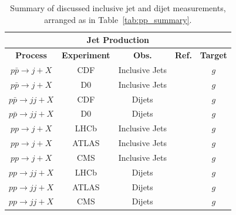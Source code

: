 \documentclass[12pt,oneside,openright]{report}
\begin{document}
\begin{spacing}{1.5}
\begin{table}
\begin{center}
\begin{tabular}{|c|c|c|c|c|}
\hline
\multicolumn{5}{|c|}{\textbf{Jet Production}}\\
\hline
\textbf{Process} & \textbf{Experiment} & \textbf{Obs.} &\textbf{Ref.} &  \textbf{Target} \\
\hline\hline
$p\bar{p} \to j + X $ & CDF & Inclusive Jets & \cite{Abulencia:2007ez,Aaltonen:2008eq} & $g$\\
$p\bar{p} \to j + X $ & D0 & Inclusive Jets & \cite{Abazov:2008ae} & $g$\\
\hline
$p\bar{p} \to jj + X $ & CDF & Dijets & \cite{Aaltonen:2008dn} & $g$\\
$p\bar{p} \to jj + X $ & D0 & Dijets & \cite{Abazov:2010fr} & $g$ \\
\hline
\hline
$pp \to j + X $ & LHCb & Inclusive Jets &\cite{LHCb:2011xqa} & $g$\\
$pp \to j + X $ & ATLAS & Inclusive Jets &\cite{Aad:2010ad,Aad:2011fc,Aad:2013lpa} & $g$ \\
$pp \to j + X $ & CMS & Inclusive Jets &\cite{CMS:2011ab,Chatrchyan:2012gwa,Chatrchyan:2012bja} & $g$ \\
\hline
$pp \to jj + X $ & LHCb & Dijets & \cite{LHCb:2011xqa} & $g$\\
$pp \to jj + X $ & ATLAS & Dijets &\cite{Aad:2010ad,Aad:2011fc} & $g$\\
$pp \to jj + X $ & CMS & Dijets & \cite{Chatrchyan:2012gwa,Chatrchyan:2012bja} & $g$\\
\hline
\end{tabular}
\end{center}
\label{tab:JET_summary}
\caption{Summary of discussed inclusive jet and dijet measurements, arranged as in Table~\ref{tab:pp_summary}.}
\end{table}%



\end{spacing}
\end{document}
